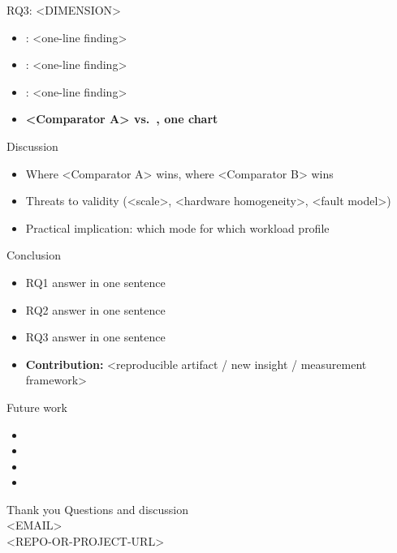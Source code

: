 \documentclass[aspectratio=169,12pt]{beamer}
\begin{document}
\begin{frame}{RQ3: <DIMENSION>}
  \begin{itemize}
    \item <Sub-metric 1>: <one-line finding>
    \item <Sub-metric 2>: <one-line finding>
    \item <Sub-metric 3>: <one-line finding>
    \item \textbf{<Comparator A> vs.\ <Comparator B>, one chart}
  \end{itemize}
\end{frame}

\begin{frame}{Discussion}
  \begin{itemize}
    \item Where <Comparator A> wins, where <Comparator B> wins
    \item Threats to validity (<scale>, <hardware homogeneity>, <fault model>)
    \item Practical implication: which mode for which workload profile
  \end{itemize}
\end{frame}

\begin{frame}{Conclusion}
  \begin{itemize}
    \item RQ1 answer in one sentence
    \item RQ2 answer in one sentence
    \item RQ3 answer in one sentence
    \item \textbf{Contribution:} <reproducible artifact / new insight / measurement framework>
  \end{itemize}
\end{frame}

\begin{frame}{Future work}
  \begin{itemize}
    \item <Direction 1 --- larger scale>
    \item <Direction 2 --- realistic workloads>
    \item <Direction 3 --- additional comparator>
    \item <Direction 4 --- different layer of the stack>
  \end{itemize}
\end{frame}

\begin{frame}[plain]{Thank you}
  \vfill
  \centering
  \Large Questions and discussion\\[1em]
  \normalsize
  <EMAIL>\\
  <REPO-OR-PROJECT-URL>
  \vfill
\end{frame}
\end{document}
